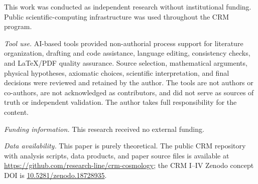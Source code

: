 \documentclass[aps,prd,twocolumn,superscriptaddress,nofootinbib]{revtex4-2}
\begin{document}
\begin{acknowledgments}
This work was conducted as independent research without institutional funding. Public scientific-computing infrastructure was used throughout the CRM program.

\textit{Tool use.} AI-based tools provided non-authorial process support for literature organization, drafting and code assistance, language editing, consistency checks, and \LaTeX/PDF quality assurance. Source selection, mathematical arguments, physical hypotheses, axiomatic choices, scientific interpretation, and final decisions were reviewed and retained by the author. The tools are not authors or co-authors, are not acknowledged as contributors, and did not serve as sources of truth or independent validation. The author takes full responsibility for the content.

\textit{Funding information.} This research received no external funding.

\textit{Data availability.} This paper is purely theoretical. The public CRM repository with analysis scripts, data products, and paper source files is available at \url{https://github.com/research-line/crm-cosmology}; the CRM I--IV Zenodo concept DOI is \href{https://doi.org/10.5281/zenodo.18728935}{10.5281/zenodo.18728935}.
\end{acknowledgments}
\end{document}

